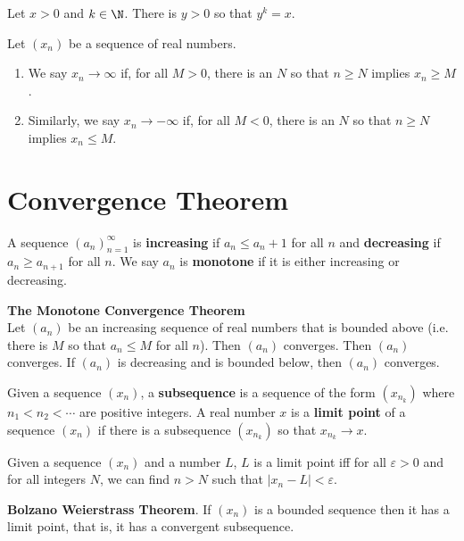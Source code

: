 \documentclass{article}
\begin{document}
\begin{theorem}
    Let $x>0$ and $k\in\N$. There is $y>0$ so that $y^k=x$.
\end{theorem}
\begin{definition}
    Let $(x_n)$ be a sequence of real numbers.
    \begin{enumerate}
        \item We say $x_n\to \infty$ if, for all $M>0$, there is an $N$ so that $n\geq N$ implies $x_n\geq M$.
        \item Similarly, we say $x_n\to-\infty$ if, for all $M<0$, there is an $N$ so that $n\geq N$ implies $x_n\leq M$.
    \end{enumerate}
\end{definition}
\section{Convergence Theorem}
\begin{definition}
    A sequence $(a_n)^\infty_{n=1}$ is \textbf{increasing} if $a_n\leq a_n+1$ for all $n$ and \textbf{decreasing} if $a_n\geq a_{n+1}$ for all $n$. We say $a_n$ is \textbf{monotone} if it is either increasing or decreasing.
\end{definition}
\begin{theorem}
    \textbf{The Monotone Convergence Theorem}\\
    Let $(a_n)$ be an increasing sequence of real numbers that is bounded above (i.e. there is $M$ so that $a_n\leq M$ for all $n$). Then $(a_n)$ converges. Then $(a_n)$ converges. If $(a_n)$ is decreasing and is bounded below, then $(a_n)$ converges.
\end{theorem}
\begin{definition}
    Given a sequence $(x_n)$, a \textbf{subsequence} is a sequence of the form $(x_{n_k})$ where $n_1<n_2<\cdots$ are positive integers.
    A real number $x$ is a \textbf{limit point} of a sequence $(x_n)$ if there is a subsequence $(x_{n_k})$ so that $x_{n_k}\to x$.
\end{definition}
\begin{theorem}
    Given a sequence $(x_n)$ and a number $L$, $L$ is a limit point iff for all $\varepsilon > 0$ and for all integers $N$, we can find $n>N$ such that $|x_n-L|<\varepsilon$.
\end{theorem}
\begin{theorem}
    \textbf{Bolzano Weierstrass Theorem}. If $(x_n)$ is a bounded sequence then it has a limit point, that is, it has a convergent subsequence.
\end{theorem}
\end{document}
